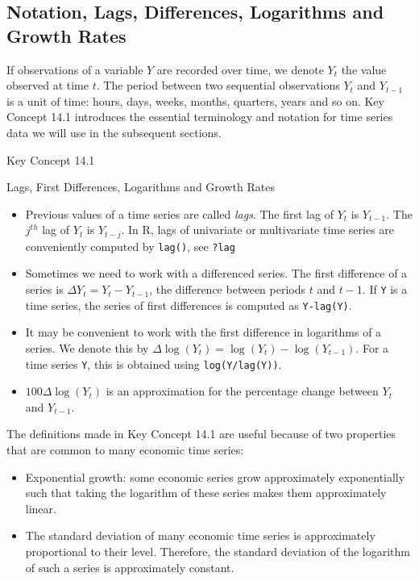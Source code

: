 \documentclass[]{book}
\theoremstyle{definition}
\theoremstyle{definition}
\theoremstyle{definition}
\theoremstyle{remark}
\begin{document}
\subsection*{Notation, Lags, Differences, Logarithms and Growth
Rates}\label{notation-lags-differences-logarithms-and-growth-rates}

If observations of a variable \(Y\) are recorded over time, we denote
\(Y_t\) the value observed at time \(t\). The period between two
sequential observations \(Y_t\) and \(Y_{t-1}\) is a unit of time:
hours, days, weeks, months, quarters, years and so on. Key Concept 14.1
introduces the essential terminology and notation for time series data
we will use in the subsequent sections.

Key Concept 14.1

Lags, First Differences, Logarithms and Growth Rates

\begin{itemize}
\item
  Previous values of a time series are called \emph{lags}. The first lag
  of \(Y_t\) is \(Y_{t-1}\). The \(j^{th}\) lag of \(Y_t\) is
  \(Y_{t-j}\). In R, lags of univariate or multivariate time series are
  conveniently computed by \texttt{lag()}, see \texttt{?lag}
\item
  Sometimes we need to work with a differenced series. The first
  difference of a series is \(\Delta Y_{t} = Y_t - Y_{t-1}\), the
  difference between periods \(t\) and \(t-1\). If \texttt{Y} is a time
  series, the series of first differences is computed as
  \texttt{Y-lag(Y)}.
\item
  It may be convenient to work with the first difference in logarithms
  of a series. We denote this by
  \(\Delta \log(Y_t) = \log(Y_t) - \log(Y_{t-1})\). For a time series
  \texttt{Y}, this is obtained using \texttt{log(Y/lag(Y))}.
\item
  \(100 \Delta \log (Y_t)\) is an approximation for the percentage
  change between \(Y_t\) and \(Y_{t-1}\).
\end{itemize}

The definitions made in Key Concept 14.1 are useful because of two
properties that are common to many economic time series:

\begin{itemize}
\item
  Exponential growth: some economic series grow approximately
  exponentially such that taking the logarithm of these series makes
  them approximately linear.
\item
  The standard deviation of many economic time series is approximately
  proportional to their level. Therefore, the standard deviation of the
  logarithm of such a series is approximately constant.
\end{itemize}
\end{document}
